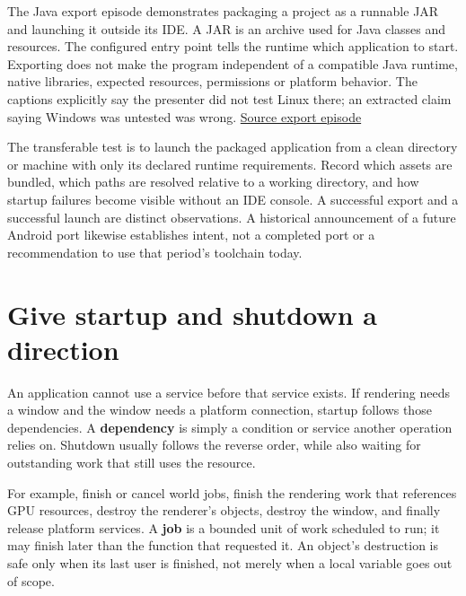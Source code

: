 \hypertarget{05-engine-i-ch008-packaging-removes-an-editor-dependency-not-every-runtime-dependency}{}

The Java export episode demonstrates packaging a project as a runnable JAR and launching it outside its IDE. A JAR is an archive used for Java classes and resources. The configured entry point tells the runtime which application to start. Exporting does not make the program independent of a compatible Java runtime, native libraries, expected resources, permissions or platform behavior. The captions explicitly say the presenter did not test Linux there; an extracted claim saying Windows was untested was wrong. \href{https://www.youtube.com/watch?v=velhSXA2CnQ}{Source export episode}

The transferable test is to launch the packaged application from a clean directory or machine with only its declared runtime requirements. Record which assets are bundled, which paths are resolved relative to a working directory, and how startup failures become visible without an IDE console. A successful export and a successful launch are distinct observations. A historical announcement of a future Android port likewise establishes intent, not a completed port or a recommendation to use that period's toolchain today.

\section{Give startup and shutdown a direction}\label{05-engine-i-ch008-give-startup-and-shutdown-a-direction}

\hypertarget{05-engine-i-ch008-give-startup-and-shutdown-a-direction}{}

An application cannot use a service before that service exists. If rendering needs a window and the window needs a platform connection, startup follows those dependencies. A \textbf{dependency} is simply a condition or service another operation relies on. Shutdown usually follows the reverse order, while also waiting for outstanding work that still uses the resource.

For example, finish or cancel world jobs, finish the rendering work that references GPU resources, destroy the renderer's objects, destroy the window, and finally release platform services. A \textbf{job} is a bounded unit of work scheduled to run; it may finish later than the function that requested it. An object's destruction is safe only when its last user is finished, not merely when a local variable goes out of scope.

